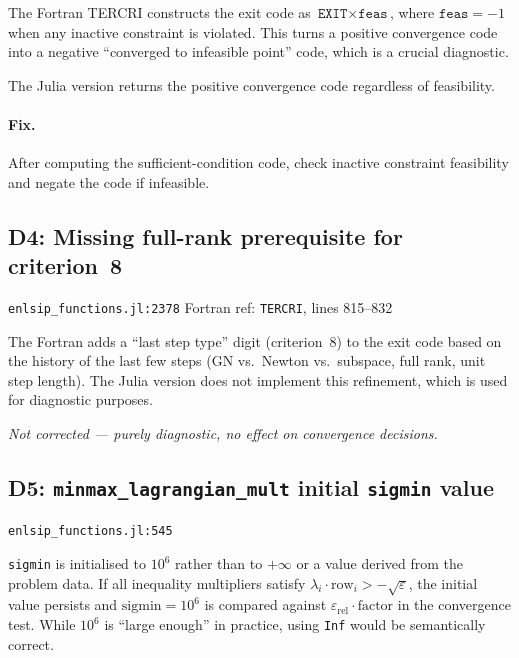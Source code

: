 \documentclass[11pt, a4paper]{article}
\newcommand{\fortranref}[1]{\texttt{#1}}
\newcommand{\juliaref}[2]{\texttt{#1:#2}}
\begin{document}
The Fortran TERCRI constructs the exit code as $\texttt{EXIT} \times
\texttt{feas}$, where $\texttt{feas} = -1$ when any inactive constraint
is violated.  This turns a positive convergence code into a negative
``converged to infeasible point'' code, which is a crucial diagnostic.

The Julia version returns the positive convergence code regardless of
feasibility.

\paragraph{Fix.}
After computing the sufficient-condition code, check inactive constraint
feasibility and negate the code if infeasible.

\subsection{D4: Missing full-rank prerequisite for criterion~8}
\label{sec:d4}

\juliaref{enlsip\_functions.jl}{2378}
\quad Fortran ref: \fortranref{TERCRI}, lines 815--832

The Fortran adds a ``last step type'' digit (criterion~8) to the exit
code based on the history of the last few steps (GN vs.\ Newton vs.\
subspace, full rank, unit step length).  The Julia version does not
implement this refinement, which is used for diagnostic purposes.

\medskip\noindent
\textit{Not corrected --- purely diagnostic, no effect on convergence decisions.}

\subsection{D5: \texttt{minmax\_lagrangian\_mult} initial \texttt{sigmin} value}
\label{sec:d5}

\juliaref{enlsip\_functions.jl}{545}

\texttt{sigmin} is initialised to $10^6$ rather than to $+\infty$ or a
value derived from the problem data.  If all inequality multipliers
satisfy $\lambda_i \cdot \mathrm{row}_i > -\sqrt{\varepsilon}$, the
initial value persists and $\mathrm{sigmin} = 10^6$ is compared against
$\varepsilon_{\mathrm{rel}} \cdot \mathrm{factor}$ in the convergence
test.  While $10^6$ is ``large enough'' in practice, using \texttt{Inf}
would be semantically correct.
\end{document}
